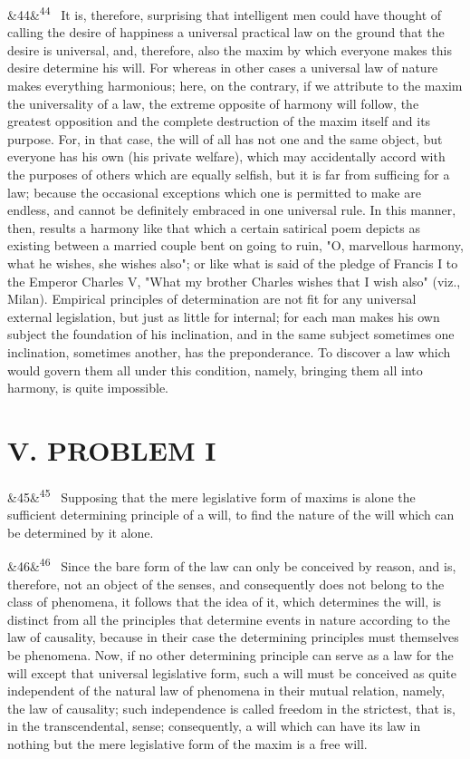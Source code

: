 \documentclass[12pt]{article}
\newcommand{\para}[1][]{\par\noindent\ifx&#1&\else\textsuperscript{\footnotesize #1}~\fi}
\begin{document}
\para[44] It is, therefore, surprising that intelligent men could have thought of calling the desire of happiness a universal practical law on the ground that the desire is universal, and, therefore, also the maxim by which everyone makes this desire determine his will. For whereas in other cases a universal law of nature makes everything harmonious; here, on the contrary, if we attribute to the maxim the universality of a law, the extreme opposite of harmony will follow, the greatest opposition and the complete destruction of the maxim itself and its purpose. For, in that case, the will of all has not one and the same object, but everyone has his own (his private welfare), which may accidentally accord with the purposes of others which are equally selfish, but it is far from sufficing for a law; because the occasional exceptions which one is permitted to make are endless, and cannot be definitely embraced in one universal rule. In this manner, then, results a harmony like that which a certain satirical poem depicts as existing between a married couple bent on going to ruin, "O, marvellous harmony, what he wishes, she wishes also"; or like what is said of the pledge of Francis I to the Emperor Charles V, "What my brother Charles wishes that I wish also" (viz., Milan). Empirical principles of determination are not fit for any universal external legislation, but just as little for internal; for each man makes his own subject the foundation of his inclination, and in the same subject sometimes one inclination, sometimes another, has the preponderance. To discover a law which would govern them all under this condition, namely, bringing them all into harmony, is quite impossible.

\section*{V. PROBLEM I}

\para[45] Supposing that the mere legislative form of maxims is alone the sufficient determining principle of a will, to find the nature of the will which can be determined by it alone.

\para[46] Since the bare form of the law can only be conceived by reason, and is, therefore, not an object of the senses, and consequently does not belong to the class of phenomena, it follows that the idea of it, which determines the will, is distinct from all the principles that determine events in nature according to the law of causality, because in their case the determining principles must themselves be phenomena. Now, if no other determining principle can serve as a law for the will except that universal legislative form, such a will must be conceived as quite independent of the natural law of phenomena in their mutual relation, namely, the law of causality; such independence is called freedom in the strictest, that is, in the transcendental, sense; consequently, a will which can have its law in nothing but the mere legislative form of the maxim is a free will.
\end{document}
